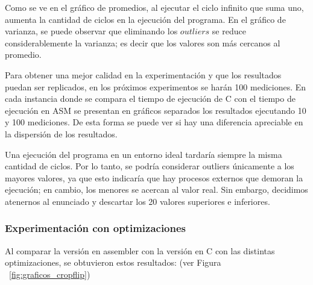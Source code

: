 \documentclass[a4paper]{article}
\begin{document}
Como se ve en el gráfico de promedios, al ejecutar el ciclo infinito que suma uno, aumenta la cantidad de ciclos en la ejecución del programa. En el gráfico de varianza, se puede observar que eliminando los $outliers$ se reduce considerablemente la varianza; es decir que los valores son más cercanos al promedio. 

Para obtener una mejor calidad en la experimentación y que los resultados puedan ser replicados, en los próximos experimentos se harán 100 mediciones. En cada instancia donde se compara el tiempo de ejecución de C con el tiempo de ejecución en ASM se presentan en gráficos separados los resultados ejecutando 10 y 100 mediciones. De esta forma se puede ver si hay una diferencia apreciable en la dispersión de los resultados. 

Una ejecución del programa en un entorno ideal tardaría siempre la misma cantidad de ciclos. Por lo tanto, se podría considerar outliers únicamente a los mayores valores, ya que esto indicaría que hay procesos externos que demoran la ejecución; en cambio, los menores se acercan al valor real. Sin embargo, decidimos atenernos al enunciado y descartar los 20 valores superiores e inferiores.

\subsubsection{Experimentación con optimizaciones}

Al comparar la versión en assembler con la versión en C con las distintas optimizaciones, se obtuvieron estos resultados: (ver Figura ~\ref{fig:graficos_cropflip})
\end{document}
